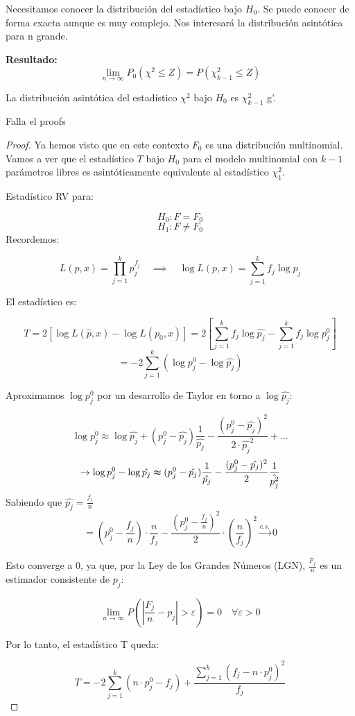  Necesitamos conocer la distribución del estadístico bajo $H_0$.
 Se puede conocer de forma exacta aunque es muy complejo. Nos interesará la distribución asintótica para n grande.

 \textbf{Resultado:}
 \[
 \lim_{n \to \infty} P_0(\chi^2 \leq Z)=P(\chi^2_{k-1} \leq Z)
 \]

La distribución asintótica del estadístico $\chi^2$ bajo $H_0$ es $\chi^2_{k-1}$ g'.

Falla el proofs
\begin{proof}
Ya hemos visto que en este contexto \( F_0 \) es una distribución multinomial. 
Vamos a ver que el estadístico \( T \) bajo \( H_0 \) para el modelo multinomial con \( k-1 \) parámetros libres es asintóticamente equivalente al estadístico \( \chi^2_1 \).

Estadístico RV para:

\[
H_0: F = F_0
\]
\[
H_1: F \neq F_0
\]
\newpage
Recordemos:

\[
L(p, x) = \prod_{j=1}^{k} p_j^{f_j} \quad \implies \quad \log L(p, x) = \sum_{j=1}^{k} f_j \log p_j
\]

El estadístico es:

\[
T = 2 \left[\log L(\hat{p}, x) - \log L(p_0, x)\right] = 2 \left[ \sum_{j=1}^{k} f_j \log \hat{p_j} - \sum_{j=1}^{k} f_j \log p_j^0 \right] 
\]\[= -2 \sum_{j=1}^{k} \left( \log p_j^0 - \log \hat{p_j} \right)
\]

Aproximamos \( \log p_j^0 \) por un desarrollo de Taylor en torno a \( \log \hat{p_j} \):

\[
\log p_j^0 \approx \log \hat{p_j} + (p_j^0 - \hat{p_j}) \frac{1}{\hat{p_j}} - \frac{(p_j^0 - \hat{p_j})^2}{2 \cdot \hat{p_j}^2}+ \dots
\]
\[
\to \log p_j^0- \log \hat{p_j}\thickapprox (p^0_j-\hat{p_j}) \frac{1}{\hat{p_j}}- \frac{(p^0_j-\hat{p_j})^2}{2}\frac{1}{\hat{p_j^2}}
\]
Sabiendo que $\hat{p_j}=\frac{f_j}{n}$
\[
=\left(p_j^0-\frac{f_j}{n}\right) \cdot \frac{n}{f_j} - \frac{\left(p_j^0-\frac{f_j}{n}\right)^2}{2}\cdot \left(\frac{n}{f_j}\right)^2 \xrightarrow{c.s.} 0
\]

Esto converge a 0, ya que, por la Ley de los Grandes Números (LGN), \( \frac{F_j}{n} \) es un estimador consistente de \( p_j \):

\[
\lim_{n \to \infty} P \left( \left| \frac{F_j}{n} - p_j \right| > \varepsilon \right) = 0 \quad \forall \varepsilon>0
\]

Por lo tanto, el estadístico T queda:

\[
T = -2 \sum_{j=1}^{k} \left( n \cdot p_j^0 - f_j \right) + \frac{\sum_{j=1}^{k} (f_j - n \cdot p_j^0)^2}{f_j}
\]

\end{proof}


